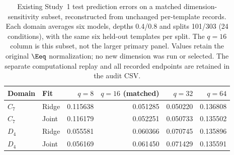 \begin{table}[htbp]
\centering\small
\begin{tabular}{@{}llrrrr@{}}
\toprule
Domain & Fit & $q=8$ & $q=16$ (matched) & $q=32$ & $q=64$ \\
\midrule
$C_7$ & Ridge & 0.115638 & 0.051285 & 0.050220 & 0.136808 \\
$C_7$ & Joint & 0.116179 & 0.052251 & 0.050733 & 0.135502 \\
$D_4$ & Ridge & 0.055581 & 0.060366 & 0.070745 & 0.135896 \\
$D_4$ & Joint & 0.056169 & 0.061450 & 0.071429 & 0.135591 \\
\bottomrule
\end{tabular}
\caption{Existing Study~1 test prediction errors on a matched dimension-sensitivity subset, reconstructed from unchanged per-template records. Each domain averages six models, depths 0.4/0.8 and splits 101/303 (24 conditions), with the same six held-out templates per split. The $q=16$ column is this subset, not the larger primary panel. Values retain the original $\Eeq$ normalization; no new dimension was run or selected. The separate computational replay and all recorded endpoints are retained in the audit CSV.}
\label{tab:dimension-sensitivity-audit}
\end{table}
